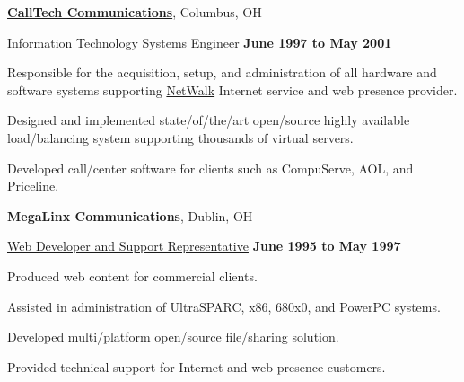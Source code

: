 \documentclass[10pt]{article}
\renewcommand\textit[1]{\underline{#1}}
\renewcommand{\section}[1]{\pagebreak[3]%
    \vspace{1.3\baselineskip}%
    \phantomsection\addcontentsline{toc}{section}{#1}%
    \noindent\llap{\scshape\smash{\parbox[t]{\marginparwidth}{\hyphenpenalty=10000\raggedright #1}}}%
    \vspace{-\baselineskip}\par}
\newcommand{\halfblankline}{\quad\vspace{-0.5\baselineskip}\pagebreak[3]}
\begin{document}
\href{http://www.calltech.com/}{\textbf{CallTech Communications}},
Columbus, OH
\begin{outerlist}

\item[] \textit{Information Technology Systems Engineer}%
        \hfill \textbf{June 1997 to May 2001}
\begin{innerlist}
\item Responsible for the acquisition, setup, and administration of all
        hardware and software systems supporting
        \href{http://www.netwalk.com/}{NetWalk} Internet service and web
        presence provider.
\item Designed and implemented state\-/of\-/the\-/art open\-/source
        highly available load\-/balancing system supporting thousands of
        virtual servers.
\item Developed call\-/center software for clients such as
        CompuServe, AOL, and Priceline.
\end{innerlist}

\end{outerlist}

\halfblankline

\textbf{MegaLinx Communications}, Dublin, OH
\begin{outerlist}

\item[] \textit{Web Developer and Support Representative}%
        \hfill \textbf{June 1995 to May 1997}
\begin{innerlist}
\item Produced web content for commercial clients.
\item Assisted in administration of UltraSPARC, x86, 680x0, and PowerPC
        systems.
\item Developed multi\-/platform open\-/source file\-/sharing solution.
\item Provided technical support for Internet and web presence
        customers.
\end{innerlist}

\end{outerlist}

%
\end{document}
